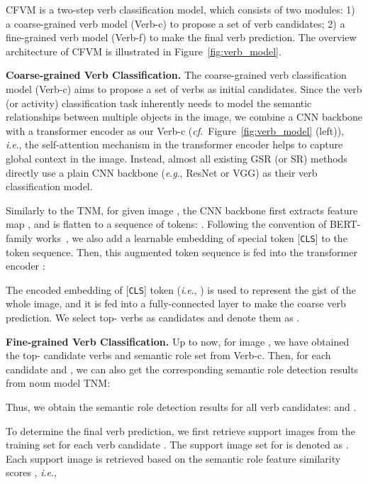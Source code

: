 \documentclass[letterpaper]{article} \usepackage{aaai22}  \usepackage{times}  \usepackage{helvet}  \usepackage{courier}  \usepackage[hyphens]{url}  \usepackage{graphicx} \urlstyle{rm} \def\UrlFont{\rm}  \usepackage{natbib}  \usepackage{caption} \DeclareCaptionStyle{ruled}{labelfont=normalfont,labelsep=colon,strut=off} \frenchspacing  \setlength{\pdfpagewidth}{8.5in}  \setlength{\pdfpageheight}{11in}
\newcommand{\ie}{\textit{i}.\textit{e}.}
\newcommand{\eg}{\textit{e}.\textit{g}.}
\newcommand{\cf}{\textit{cf.}}
\begin{document}
CFVM is a two-step verb classification model, which consists of two modules: 1) a coarse-grained verb model (Verb-c) to propose a set of verb candidates; 2) a fine-grained verb model (Verb-f) to make the final verb prediction. The overview architecture of CFVM is illustrated in Figure~\ref{fig:verb_model}.


\noindent\textbf{Coarse-grained Verb Classification.}
The coarse-grained verb classification model (Verb-c) aims to propose a set of verbs as initial candidates. Since the verb (or activity) classification task inherently needs to model the semantic relationships between multiple objects in the image, we combine a CNN backbone with a transformer encoder as our Verb-c (\cf~Figure~\ref{fig:verb_model} (left)), \ie, the self-attention mechanism in the transformer encoder helps to capture global context in the image. Instead, almost all existing GSR (or SR) methods directly use a plain CNN backbone (\eg, ResNet or VGG) as their verb classification model.



Similarly to the TNM, for given image , the CNN backbone first extracts feature map , and  is flatten to a sequence of tokens: . Following the convention of BERT-family works~\cite{devlin2018bert}, we also add a learnable embedding  of special token [\texttt{CLS}] to the token sequence. Then, this augmented token sequence is fed into the transformer encoder :

The encoded embedding of [\texttt{CLS}] token (\ie, ) is used to represent the gist of the whole image, and it is fed into a fully-connected layer to make the coarse verb prediction. We select top- verbs as candidates and denote them as .








\noindent\textbf{Fine-grained Verb Classification.} Up to now, for image , we have obtained the top- candidate verbs  and semantic role set  from Verb-c. Then, for each candidate  and , we can also get the corresponding semantic role detection results from noun model TNM:

Thus, we obtain the semantic role detection results for all  verb candidates:  and .

To determine the final verb prediction, we first retrieve  support images from the training set for each verb candidate . The support image set for  is denoted as . Each support image  is retrieved based on the semantic role feature similarity scores , \ie,
\end{document}
